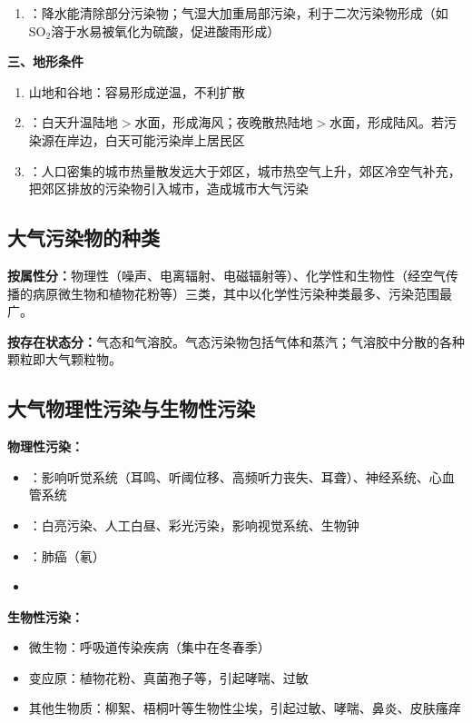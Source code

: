 \begin{keybox}
\begin{enumerate}[leftmargin=*]
    \item {}：降水能清除部分污染物；气湿大加重局部污染，利于二次污染物形成（如SO$_2$溶于水易被氧化为硫酸，促进酸雨形成）
\end{enumerate}

\textbf{三、地形条件}
\begin{enumerate}[leftmargin=*]
    \item 山地和谷地：容易形成逆温，不利扩散
    \item {}：白天升温陆地$>$水面，形成海风；夜晚散热陆地$>$水面，形成陆风。若污染源在岸边，白天可能污染岸上居民区
    \item {}：人口密集的城市热量散发远大于郊区，城市热空气上升，郊区冷空气补充，把郊区排放的污染物引入城市，造成城市大气污染
\end{enumerate}
\end{keybox}

\subsection{大气污染物的种类}

\textbf{按属性分：}物理性（噪声、电离辐射、电磁辐射等）、化学性和生物性（经空气传播的病原微生物和植物花粉等）三类，其中以化学性污染种类最多、污染范围最广。

\textbf{按存在状态分：}气态和气溶胶。气态污染物包括气体和蒸汽；气溶胶中分散的各种颗粒即大气颗粒物。

\subsection{大气物理性污染与生物性污染}

\begin{defbox}
\textbf{物理性污染：}
\begin{itemize}[leftmargin=*]
    \item {}：影响听觉系统（耳鸣、听阈位移、高频听力丧失、耳聋）、神经系统、心血管系统
    \item {}：白亮污染、人工白昼、彩光污染，影响视觉系统、生物钟
    \item {}：肺癌（氡）
    \item {}
\end{itemize}

\textbf{生物性污染：}
\begin{itemize}[leftmargin=*]
    \item 微生物：呼吸道传染疾病（集中在冬春季）
    \item 变应原：植物花粉、真菌孢子等，引起哮喘、过敏
    \item 其他生物质：柳絮、梧桐叶等生物性尘埃，引起过敏、哮喘、鼻炎、皮肤瘙痒
\end{itemize}
\end{defbox}


